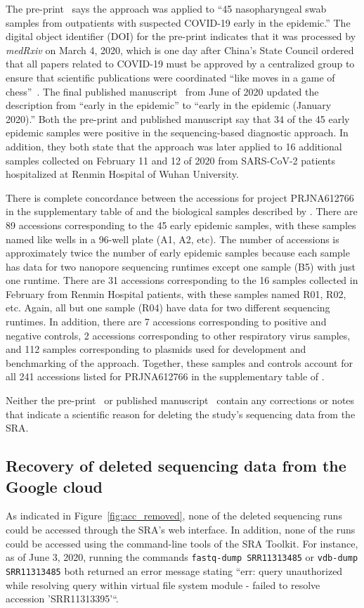 \documentclass[9pt,twocolumn,twoside]{gsajnl_modified}
\begin{document}
The pre-print~\citep{wang2020medRxiv} says the approach was applied to ``45 nasopharyngeal swab samples from outpatients with suspected COVID-19 early in the epidemic.''
The digital object identifier (DOI) for the pre-print indicates that it was processed by \textit{medRxiv} on March 4, 2020, which is one day after China's State Council ordered that all papers related to COVID-19 must be approved by a centralized group to ensure that scientific publications were coordinated ``like moves in a game of chess''~\citep{Kang2020}.
The final published manuscript~\citep{wang2020small} from June of 2020 updated the description from ``early in the epidemic'' to ``early in the epidemic (January 2020).''
Both the pre-print and published manuscript say that 34 of the 45 early epidemic samples were positive in the sequencing-based diagnostic approach.
In addition, they both state that the approach was later applied to 16 additional samples collected on February 11 and 12 of 2020 from SARS-CoV-2 patients hospitalized at Renmin Hospital of Wuhan University.

There is complete concordance between the accessions for project PRJNA612766 in the supplementary table of \citet{farkas2020insights} and the biological samples described by \citet{wang2020medRxiv}.
There are 89 accessions corresponding to the 45 early epidemic samples, with these samples named like wells in a 96-well plate (A1, A2, etc).
The number of accessions is approximately twice the number of early epidemic samples because each sample has data for two nanopore sequencing runtimes except one sample (B5) with just one runtime.
 There are 31 accessions corresponding to the 16 samples collected in February from Renmin Hospital patients, with these samples named R01, R02, etc.
 Again, all but one sample (R04) have data for two different sequencing runtimes.
 In addition, there are 7 accessions corresponding to positive and negative controls, 2 accessions corresponding to other respiratory virus samples, and 112 samples corresponding to plasmids used for development and benchmarking of the approach.
 Together, these samples and controls account for all 241 accessions listed for PRJNA612766 in the supplementary table of \citet{farkas2020insights}.

Neither the pre-print~\citep{wang2020medRxiv} or published manuscript~\citep{wang2020small} contain any corrections or notes that indicate a scientific reason for deleting the study's sequencing data from the SRA.

\subsection{Recovery of deleted sequencing data from the Google cloud} 
As indicated in Figure~\ref{fig:acc_removed}, none of the deleted sequencing runs could be accessed through the SRA's web interface.
In addition, none of the runs could be accessed using the command-line tools of the SRA Toolkit.
For instance, as of June 3, 2020, running the commands \texttt{fastq-dump SRR11313485} or \texttt{vdb-dump SRR11313485} both returned an error message stating ``err: query unauthorized while resolving query within virtual file system module - failed to resolve accession 'SRR11313395'``.
\end{document}
